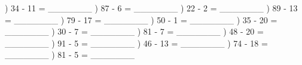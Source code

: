 \documentclass{article}%
\begin{document}
\newline%
\newline%
) 34 {-} 11 = \_\_\_\_\_\_\_%
\newline%
\newline%
) 87 {-} 6 = \_\_\_\_\_\_\_%
\newline%
\newline%
) 22 {-} 2 = \_\_\_\_\_\_\_%
\newline%
\newline%
) 89 {-} 13 = \_\_\_\_\_\_\_%
\newline%
\newline%
) 79 {-} 17 = \_\_\_\_\_\_\_%
\newline%
\newline%
) 50 {-} 1 = \_\_\_\_\_\_\_%
\newline%
\newline%
) 35 {-} 20 = \_\_\_\_\_\_\_%
\newline%
\newline%
) 30 {-} 7 = \_\_\_\_\_\_\_%
\newline%
\newline%
) 81 {-} 7 = \_\_\_\_\_\_\_%
\newline%
\newline%
) 48 {-} 20 = \_\_\_\_\_\_\_%
\newline%
\newline%
) 91 {-} 5 = \_\_\_\_\_\_\_%
\newline%
\newline%
) 46 {-} 13 = \_\_\_\_\_\_\_%
\newline%
\newline%
) 74 {-} 18 = \_\_\_\_\_\_\_%
\newline%
\newline%
) 81 {-} 5 = \_\_\_\_\_\_\_%
\newline%
\newline%
\end{document}
